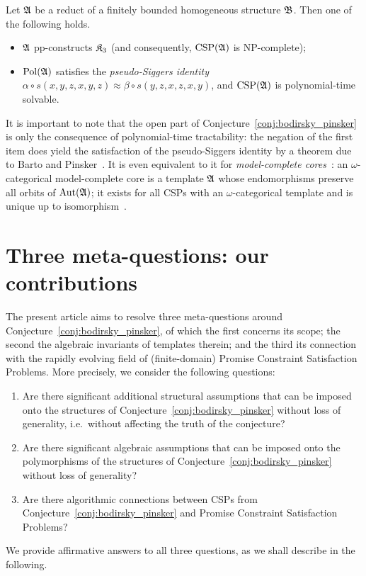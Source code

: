 \begin{conjecture} \label{conj:bodirsky_pinsker} Let $\mathfrak{A}$ be a reduct of a finitely bounded
homogeneous structure $\mathfrak{B}$. Then one of the following holds.
% 
\begin{itemize}
    \item $\mathfrak{A}$ pp-constructs $\mathfrak{K}_3$ (and consequently, $\mathrm{CSP}(\mathfrak{A})$ is NP-complete);
    \item $\mathrm{Pol}(\mathfrak{A})$ satisfies the \emph{pseudo-Siggers identity}  $\alpha \circ s(x,y,z,x,y,z) \approx \beta \circ s(y,z,x,z,x,y)$, and  $\mathrm{CSP}(\mathfrak{A})$ is polynomial-time solvable.
\end{itemize} 
\end{conjecture} 
 
 It is important to note that the open part of Conjecture~\ref{conj:bodirsky_pinsker} is only the consequence of polynomial-time tractability: the negation of the first item does yield the satisfaction of the pseudo-Siggers identity by a theorem due to Barto and Pinsker~\cite{barto_pinsker_journal}. It is even equivalent to it for \emph{model-complete cores}~\cite[Theorem~1.3]{barto2019equations}: an $\omega$-categorical model-complete core is a template $\mathfrak{A}$ whose endomorphisms preserve all orbits of $\mathrm{Aut}(\mathfrak{A})$; it exists for all CSPs with an $\omega$-categorical template and is unique up to isomorphism~\cite{bodirsky2007cores}. 
  

\section{Three meta-questions: our contributions}\label{section:introduction_contributions}
 
The present article aims to resolve three meta-questions around  Conjecture~\ref{conj:bodirsky_pinsker}, of which the first concerns its scope; the second the algebraic invariants of templates therein; and the third  its connection with the rapidly evolving field of (finite-domain) Promise Constraint Satisfaction Problems. More precisely, we consider the following questions:
%
\begin{enumerate}
    \item Are there significant additional  structural  assumptions that  can be imposed onto the structures of Conjecture~\ref{conj:bodirsky_pinsker} without loss of generality, i.e.~without affecting the truth of the conjecture?
    \item Are there significant algebraic   assumptions that  can be imposed onto the polymorphisms of the structures of Conjecture~\ref{conj:bodirsky_pinsker} without loss of generality?
    \item Are there  algorithmic connections between CSPs from  Conjecture~\ref{conj:bodirsky_pinsker} and  Promise Constraint Satisfaction Problems?
\end{enumerate}
%
We provide affirmative answers to all three questions, as we shall  describe  in the following. 

